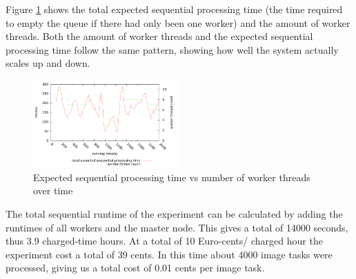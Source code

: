 \documentclass[10pt,journal,compsoc]{IEEEtran}
\begin{document}
Figure \ref{fig:exp1.3} shows the total expected sequential processing time (the
time required to empty the queue if there had only been one worker) and the
amount of worker threads. Both the amount of worker threads and the expected
sequential processing time follow the same pattern, showing how well the system
actually scales up and down.
\begin{figure}
    \centering  
    \includegraphics[width=0.5\textwidth]{../plot_data/plot3.pdf}
    \caption{Expected sequential processing time vs number of worker threads
    over time}
    \label{fig:exp1.3}
\end{figure}

The total sequential runtime of the experiment can be calculated by adding the
runtimes of all workers and the master node. This gives a total of 14000
seconds, thus 3.9 charged-time hours. At a total of 10 Euro-cents/ charged hour
the experiment cost a total of 39 cents. In this time about 4000 image tasks were
processed, giving us a total cost of 0.01 cents per image task.

\end{document}
